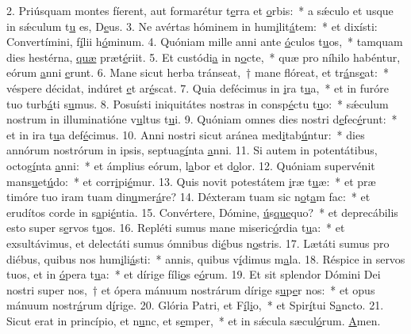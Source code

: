 2. Priúsquam montes fíerent, aut formarétur t\uline{e}rra et \uline{o}rbis:~* a sǽculo et usque in sǽculum t\uline{u} es, D\uline{e}us.
3. Ne avértas hóminem in hum\uline{i}lit\uline{á}tem:~* et dixísti: Convertímini, f\uline{í}lii h\uline{ó}minum.
4. Quóniam mille anni ante \uline{ó}culos t\uline{u}os,~* tamquam dies hestérna, \uline{quæ} præt\uline{é}riit.
5. Et custódi\uline{a} in n\uline{o}cte,~* quæ pro níhilo habéntur, eórum \uline{a}nni \uline{e}runt.
6. Mane sicut herba tránseat,~† mane flóreat, et tr\uline{á}ns\uline{e}at:~* véspere décidat, indúret \uline{e}t ar\uline{é}scat.
7. Quia defécimus in \uline{i}ra t\uline{u}a,~* et in furóre tuo turb\uline{á}ti s\uline{u}mus.
8. Posuísti iniquitátes nostras in consp\uline{é}ctu t\uline{u}o:~* sǽculum nostrum in illuminatióne v\uline{u}ltus t\uline{u}i.
9. Quóniam omnes dies nostri d\uline{e}fec\uline{é}runt:~* et in ira t\uline{u}a def\uline{é}cimus.
10. Anni nostri sicut aránea med\uline{i}tab\uline{ú}ntur:~* dies annórum nostrórum in ipsis, septuag\uline{í}nta \uline{a}nni.
11. Si autem in potentátibus, octog\uline{í}nta \uline{a}nni:~* et ámplius eórum, l\uline{a}bor et d\uline{o}lor.
12. Quóniam supervénit mans\uline{u}et\uline{ú}do:~* et corr\uline{i}pi\uline{é}mur.
13. Quis novit potestátem \uline{i}ræ t\uline{u}æ:~* et præ timóre tuo iram tuam din\uline{u}mer\uline{á}re?
14. Déxteram tuam sic n\uline{o}t\uline{a}m fac:~* et erudítos corde in s\uline{a}pi\uline{é}ntia.
15. Convértere, Dómine, \uline{ú}s\uline{que}quo?~* et deprecábilis esto super s\uline{e}rvos t\uline{u}os.
16. Repléti sumus mane miseric\uline{ó}rdia t\uline{u}a:~* et exsultávimus, et delectáti sumus ómnibus di\uline{é}bus n\uline{o}stris.
17. Lætáti sumus pro diébus, quibus nos hum\uline{i}li\uline{á}sti:~* annis, quibus v\uline{í}dimus m\uline{a}la.
18. Réspice in servos tuos, et in \uline{ó}pera t\uline{u}a:~* et dírige fíli\uline{o}s e\uline{ó}rum.
19. Et sit splendor Dómini Dei nostri super nos,~† et ópera mánuum nostrárum dírige s\uline{u}p\uline{e}r nos:~* et opus mánuum nostr\uline{á}rum d\uline{í}rige.
20. Glória Patri, et F\uline{í}l\uline{i}o,~* et Spir\uline{í}tui S\uline{a}ncto.
21. Sicut erat in princípio, et n\uline{u}nc, et s\uline{e}mper,~* et in sǽcula sæcul\uline{ó}rum. \uline{A}men.
